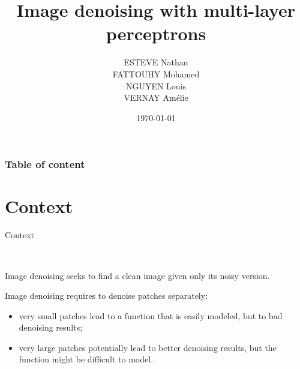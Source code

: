 \documentclass[8pt]{beamer}
\title{Image denoising with multi-layer perceptrons}
\author{ESTEVE Nathan \\ FATTOUHY Mohamed \\ NGUYEN Louis\\ VERNAY Amélie}
\date{\today}
\begin{document}
\begin{frame}
\titlepage
\end{frame}




\begin{frame}
\frametitle{Table of content}
\tableofcontents
\end{frame}


\section{Context}

\begin{frame}{Context}
\begin{mybox}
\end{mybox}\



\begin{mybox}
Image denoising seeks to find a clean image given only its noisy version.

\end{mybox}

\begin{mybox}
Image denoising requires to denoise patches separately:

\begin{itemize}
\item very small patches lead to a function that is easily modeled, but to bad denoising results;
\item very large patches potentially lead to better denoising results, but the function might be difficult to model.
\end{itemize}

\end{mybox}


\end{frame}
\end{document}
